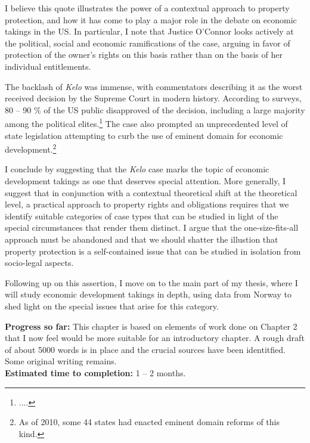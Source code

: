 \documentclass[12pt,a4paper]{article} %
\begin{document}
\begin{quote}


\end{quote}

I believe this quote illustrates the power of a contextual approach to property protection, and how it has come to play a major role in the debate on economic takings in the US. In particular, I note that Justice O'Connor looks actively at the political, social and economic ramifications of the case, arguing in favor of protection of the owner's rights on this basis rather than on the basis of her individual entitlements.

The backlash of {\it Kelo} was immense, with commentators describing it as the worst received decision by the Supreme Court in modern history. According to surveys, 80 -- 90 \% of the US public disapproved of the decision, including a large majority among the political elites.\footnote{....} The case also prompted an unprecedented level of state legislation attempting to curb the use of eminent domain for economic development.\footnote{As of 2010, some 44 states had enacted eminent domain reforms of this kind.}

I conclude by suggesting that the {\it Kelo} case marks the topic of economic development takings as one that deserves special attention. More generally, I suggest that in conjunction with a contextual theoretical shift at the theoretical level, a practical approach to property rights and obligations requires that we identify suitable categories of case types that can be studied in light of the special circumstances that render them distinct. I argue that the one-size-fits-all approach must be abandoned and that we should  shatter the illustion that property protection is a self-contained issue that can be studied in isolation from socio-legal aspects.

Following up on this assertion, I move on to the main part of my thesis, where I will study economic development takings in depth, using data from Norway to shed light on the special issues that arise for this category.

{\bf Progress so far:} This chapter is based on elements of work done on Chapter 2 that I now feel would be more suitable for an introductory chapter. A rough draft of about 5000 words is in place and the crucial sources have been identitfied. Some original writing remains. \\

{\bf Estimated time to completion:} 1 -- 2 months.
\end{document}
